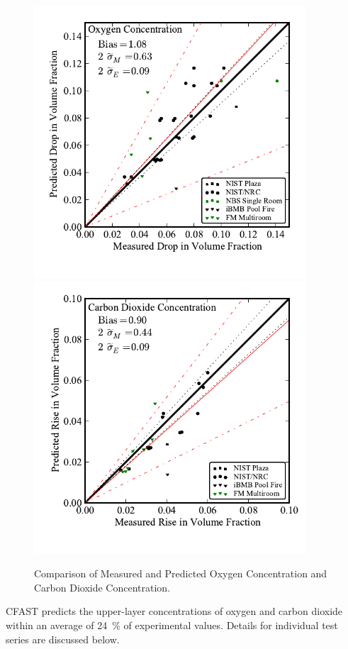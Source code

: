 \begin{figure}
\begin{center}
\includegraphics[width=4.0in]{FIGURES/ScatterPlots/Oxygen_Concentration}  \\
\includegraphics[width=4.0in]{FIGURES/ScatterPlots/Carbon_Dioxide_Concentration}  \\
\end{center}
\caption{Comparison of Measured and Predicted Oxygen Concentration and Carbon Dioxide Concentration.} \label{fig:Species_Scatter}
\end{figure}

CFAST predicts the upper-layer concentrations of oxygen and carbon dioxide within an average of 24~\% of experimental values. Details for individual test series are discussed below. 

